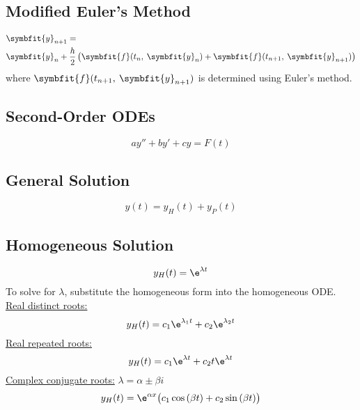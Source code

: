 \documentclass{article}
\begin{document}
\begin{multicols}{3}
    \subsection*{Modified Euler's Method}
    \begin{align*}
         & \symbfit{y}_{n+1} =                                                                                                       \\
         & \symbfit{y}_{n} + \frac{h}{2}\left( \symbfit{f}(t_n,\: \symbfit{y}_n) + \symbfit{f}(t_{n+1},\: \symbfit{y}_{n+1}) \right)
    \end{align*}
    where $\symbfit{f}(t_{n+1},\: \symbfit{y}_{n+1})$ is determined using Euler's method.
    \subsection*{Second-Order ODEs}
    \begin{equation*}
        ay'' + by' + cy = F(t)
    \end{equation*}
    \subsection*{General Solution}
    \begin{equation*}
        y(t) = y_H(t) + y_P(t)
    \end{equation*}
    \subsection*{Homogeneous Solution}
    \begin{equation*}
        y_H(t) = \e^{\lambda t}
    \end{equation*}
    To solve for $\lambda$, substitute the homogeneous form into the homogeneous ODE. \\
    \underline{Real distinct roots:}
    \begin{equation*}
        y_H(t) = c_1\e^{\lambda_1 t} + c_2\e^{\lambda_2 t}
    \end{equation*}
    \underline{Real repeated roots:}
    \begin{equation*}
        y_H(t) = c_1\e^{\lambda t} + c_2 t\e^{\lambda t}
    \end{equation*}
    \underline{Complex conjugate roots:} $\lambda = \alpha \pm \beta i$
    \begin{equation*}
        y_H(t) = \e^{\alpha x}\bigl( c_1\cos{\left( \beta t \right)} + c_2 \sin{\left( \beta t \right)} \bigr)
    \end{equation*}

\end{multicols}
\end{document}
